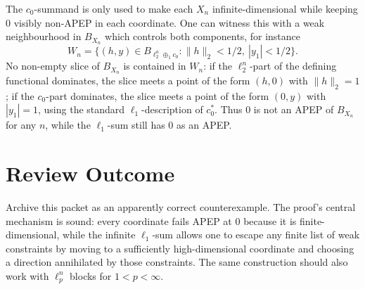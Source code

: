 \documentclass[11pt]{article}
\begin{document}
The \(c_0\)-summand is only used to make each \(X_n\) infinite-dimensional while keeping \(0\) visibly non-APEP in each coordinate. One can witness this with a weak neighbourhood in \(B_{X_n}\) which controls both components, for instance
\[
  W_n=\{(h,y)\in B_{\ell_2^n\oplus_1 c_0}:\|h\|_2<1/2,\ |y_1|<1/2\}.
\]
No non-empty slice of \(B_{X_n}\) is contained in \(W_n\): if the \(\ell_2^n\)-part of the defining functional dominates, the slice meets a point of the form \((h,0)\) with \(\|h\|_2=1\); if the \(c_0\)-part dominates, the slice meets a point of the form \((0,y)\) with \(|y_1|=1\), using the standard \(\ell_1\)-description of \(c_0^*\). Thus \(0\) is not an APEP of \(B_{X_n}\) for any \(n\), while the \(\ell_1\)-sum still has \(0\) as an APEP.

\section*{Review Outcome}

Archive this packet as an apparently correct counterexample. The proof's central mechanism is sound: every coordinate fails APEP at \(0\) because it is finite-dimensional, while the infinite \(\ell_1\)-sum allows one to escape any finite list of weak constraints by moving to a sufficiently high-dimensional coordinate and choosing a direction annihilated by those constraints. The same construction should also work with \(\ell_p^n\) blocks for \(1<p<\infty\).
\end{document}
